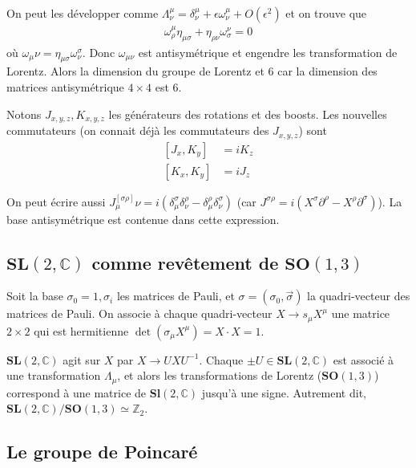 \documentclass[10pt]{report}
\begin{document}
On peut les d\'evelopper comme $\Lambda_\nu^\mu = \delta_\nu^\mu + \epsilon \omega_\nu^\mu + O(\epsilon^2)$ et on trouve que
\begin{align}
    \omega_\rho^\mu \eta_{\mu\sigma} + \eta_{\rho\nu} \omega_\sigma^\nu = 0
\end{align}
o\`u $\omega_\mu\nu = \eta_{\mu\sigma}\omega_\nu^\sigma$. Donc $\omega_{\mu\nu}$ est antisym\'etrique et engendre les transformation de Lorentz. Alors la dimension du groupe de Lorentz et $6$ car la dimension des matrices antisym\'etrique $4 \times 4$ est $6$. 

Notons $J_{x,y,z}, K_{x,y,z}$ les g\'en\'erateurs des rotations et des boosts. Les nouvelles commutateurs (on connait d\'ej\`a les commutateurs des $J_{x,y,z}$) sont
\begin{align}
    \left[ J_x, K_y \right] &= iK_z\\
    \left[ K_x, K_y \right] &= iJ_z
\end{align}

On peut \'ecrire aussi $J^{[\sigma\rho]}_\mu \nu = i\left( \delta_\mu^\sigma \delta_\nu^\rho  -\delta^\rho_\mu \delta^\sigma_\nu\right)$ (car $J^{\sigma \rho} = i\left( X^\sigma\partial^\rho - X^\rho\partial^\sigma \right)$). La base antisym\'etrique est contenue dans cette expression.

\subsection{$\mathbf{SL}(2,\mathbb{C})$ comme rev\^etement de $\mathbf{SO}(1,3)$}

Soit la base $\sigma_0 = 1, \sigma_i$ les matrices de Pauli, et $\sigma = (\sigma_0, \vec{\sigma})$ la quadri-vecteur des matrices de Pauli. On associe \`a chaque quadri-vecteur $X \to s_\mu X^\mu$ une matrice $2 \times 2$ qui est hermitienne $\det (\sigma_\mu X^\mu) = X \cdot X = 1$.

$\mathbf{SL}(2,\mathbb{C})$ agit sur $X$ par $X \to UXU^{-1}$. Chaque $\pm U\in \mathbf{SL}(2,\mathbb{C})$ est associ\'e \`a une transformation $\Lambda_\mu$, et alors les transformations de Lorentz ($\mathbf{SO}(1,3)$) correspond \`a une matrice de $\mathbf{Sl}(2,\mathbb{C})$ jusqu'\`a une signe. Autrement dit, $\mathbf{SL}(2,\mathbb{C})/\mathbf{SO}(1,3) \simeq \mathbb{Z}_2$. 

\subsection{Le groupe de Poincar\'e}
\end{document}
